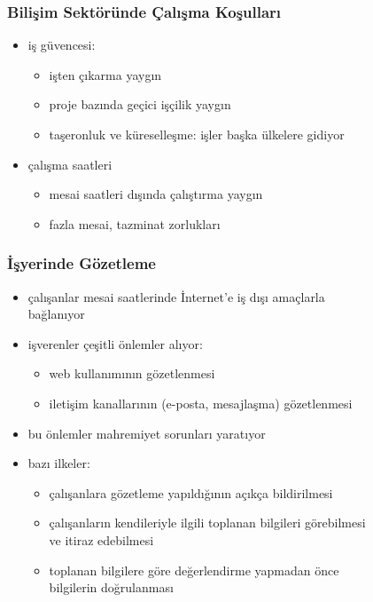 \documentclass[dvipsnames]{beamer}
\theoremstyle{definition}
\theoremstyle{example}
\theoremstyle{plain}
\begin{document}
\begin{frame}
  \frametitle{Bilişim Sektöründe Çalışma Koşulları}

  \begin{itemize}
    \item iş güvencesi:
    \begin{itemize}
      \item işten çıkarma yaygın
      \item proje bazında geçici işçilik yaygın
      \item taşeronluk ve küreselleşme: işler başka ülkelere gidiyor
    \end{itemize}

    \pause
    \medskip
    \item çalışma saatleri
    \begin{itemize}
      \item mesai saatleri dışında çalıştırma yaygın
      \item fazla mesai, tazminat zorlukları
    \end{itemize}
  \end{itemize}
\end{frame}

\begin{frame}
  \frametitle{İşyerinde Gözetleme}

  \begin{itemize}
    \item çalışanlar mesai saatlerinde İnternet'e iş dışı amaçlarla\\
      bağlanıyor

    \item işverenler çeşitli önlemler alıyor:
    \begin{itemize}
      \item web kullanımının gözetlenmesi
      \item iletişim kanallarının (e-posta, mesajlaşma) gözetlenmesi
    \end{itemize}
    \item bu önlemler mahremiyet sorunları yaratıyor

    \medskip
    \item bazı ilkeler:
    \begin{itemize}
      \item çalışanlara gözetleme yapıldığının açıkça bildirilmesi
      \item çalışanların kendileriyle ilgili toplanan bilgileri görebilmesi\\
        ve itiraz edebilmesi
      \item toplanan bilgilere göre değerlendirme yapmadan önce\\
        bilgilerin doğrulanması
    \end{itemize}
  \end{itemize}
\end{frame}
\end{document}
